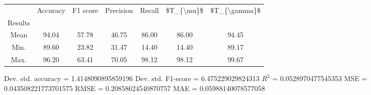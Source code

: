 \begin{tabular}{|c|c|c|c|c|c|c|}
\toprule
{} &  Accuracy &  F1 score &  Precision &  Recall &  \$T\_\{\textbackslash mu\}\$ &  \$T\_\{\textbackslash gamma\}\$ \\
Results &           &           &            &         &            &               \\
\hline
Mean    &     94.04 &     57.78 &      46.75 &   86.00 &      86.00 &         94.45 \\
Min.    &     89.60 &     23.82 &      31.47 &   14.40 &      14.40 &         89.17 \\
Max.    &     96.20 &     63.41 &      70.05 &   98.12 &      98.12 &         99.67 \\
\bottomrule
\end{tabular}

 Dev. std. accuracy = 1.4148090895859196
 Dev. std. F1-score = 6.475229029824313
 $R^2$ = 0.0528970477545353
 MSE = 0.043508221773701575
 RMSE = 0.20858624540870757
 MAE = 0.05988140078577058
